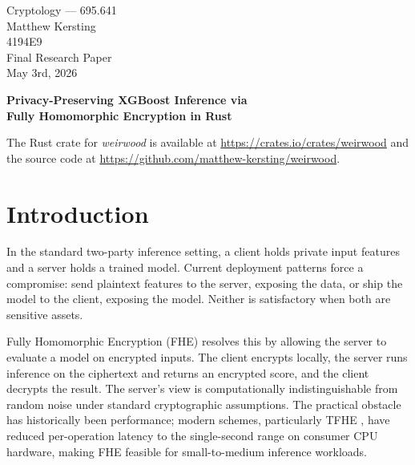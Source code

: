 \documentclass[12pt]{article}
\begin{document}
\onehalfspacing
\raggedright   %

\begin{titlepage}
\noindent
{\normalsize
Cryptology --- 695.641\\
Matthew Kersting\\
4194E9\\
Final Research Paper\\
May 3rd, 2026
}

\vfill
\begin{center}
{\LARGE\textbf{Privacy-Preserving XGBoost Inference via\\[0.3em]
Fully Homomorphic Encryption in Rust}}
\end{center}
\vfill
\end{titlepage}

\newpage

The Rust crate for \textit{weirwood} is available at
\url{https://crates.io/crates/weirwood} and the source code at
\url{https://github.com/matthew-kersting/weirwood}.

\section{Introduction}

In the standard two-party inference setting, a client holds private input features and a server holds a trained model. Current deployment patterns force a compromise: send plaintext features to the server, exposing the data, or ship the model to the client, exposing the model. Neither is satisfactory when both are sensitive assets.

Fully Homomorphic Encryption (FHE) resolves this by allowing the server to evaluate a model on encrypted inputs. The client encrypts locally, the server runs inference on the ciphertext and returns an encrypted score, and the client decrypts the result. The server's view is computationally indistinguishable from random noise under standard cryptographic assumptions. The practical obstacle has historically been performance; modern schemes, particularly TFHE \cite{tfhe}, have reduced per-operation latency to the single-second range on consumer CPU hardware, making FHE feasible for small-to-medium inference workloads.
\end{document}
